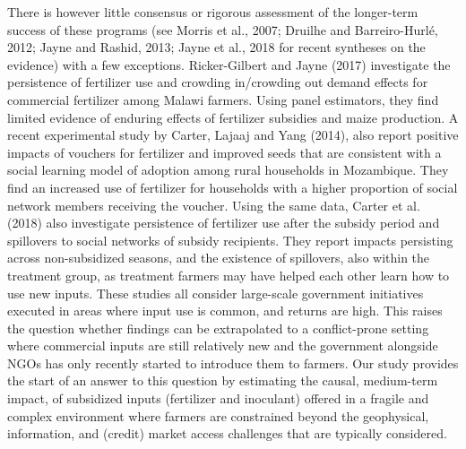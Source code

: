 There is however little consensus or rigorous assessment of the longer-term success of these programs (see Morris et al., 2007; Druilhe and Barreiro-Hurlé, 2012; Jayne and Rashid, 2013; Jayne et al., 2018 for recent syntheses on the evidence) with a few exceptions. Ricker-Gilbert and Jayne (2017) investigate the persistence of fertilizer use and crowding in/crowding out demand effects for commercial fertilizer among Malawi farmers. Using panel estimators, they find limited evidence of enduring effects of fertilizer subsidies and maize production. A recent experimental study by Carter, Lajaaj and Yang (2014), also report positive impacts of vouchers for fertilizer and improved seeds that are consistent with a social learning model of adoption among rural households in Mozambique. They find an increased use of fertilizer for households with a higher proportion of social network members receiving the voucher. Using the same data, Carter et al. (2018) also investigate persistence of fertilizer use after the subsidy period and spillovers to social networks of subsidy recipients. They report impacts persisting across non-subsidized seasons, and the existence of spillovers, also within the treatment group, as treatment farmers may have helped each other learn how to use new inputs. 
These studies all consider large-scale government initiatives executed in areas where input use is common, and returns are high. This raises the question whether findings can be extrapolated to a conflict-prone setting where commercial inputs are still relatively new and the government alongside NGOs has only recently started to introduce them to farmers. Our study provides the start of an answer to this question by estimating the causal, medium-term impact, of subsidized inputs (fertilizer and inoculant) offered in a fragile and complex environment where farmers are constrained beyond the geophysical, information, and (credit) market access challenges that are typically considered.   

